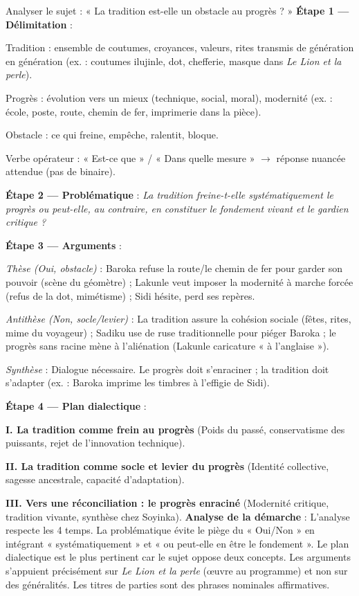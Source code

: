 \documentclass[11pt]{article}
\newcommand{\cle}[1]{{\popxbold\color{popdark}#1}}
\begin{document}
\begin{exoresolu}{Analyser le sujet : « La tradition est-elle un obstacle au progrès ? »}
\textbf{Étape 1 — Délimitation} :\par
\cle{Tradition} : ensemble de coutumes, croyances, valeurs, rites transmis de génération en génération (ex. : coutumes ilujinle, dot, chefferie, masque dans \emph{Le Lion et la perle}).\par
\cle{Progrès} : évolution vers un mieux (technique, social, moral), modernité (ex. : école, poste, route, chemin de fer, imprimerie dans la pièce).\par
\cle{Obstacle} : ce qui freine, empêche, ralentit, bloque.\par
\cle{Verbe opérateur} : « Est-ce que » / « Dans quelle mesure » $\rightarrow$ réponse nuancée attendue (pas de binaire).\par
\textbf{Étape 2 — Problématique} : \emph{La tradition freine-t-elle systématiquement le progrès ou peut-elle, au contraire, en constituer le fondement vivant et le gardien critique ?}\par
\textbf{Étape 3 — Arguments} :\par
\textit{Thèse (Oui, obstacle)} : Baroka refuse la route/le chemin de fer pour garder son pouvoir (scène du géomètre) ; Lakunle veut imposer la modernité à marche forcée (refus de la dot, mimétisme) ; Sidi hésite, perd ses repères.\par
\textit{Antithèse (Non, socle/levier)} : La tradition assure la cohésion sociale (fêtes, rites, mime du voyageur) ; Sadiku use de ruse traditionnelle pour piéger Baroka ; le progrès sans racine mène à l'aliénation (Lakunle caricature « à l'anglaise »).\par
\textit{Synthèse} : Dialogue nécessaire. Le progrès doit s'enraciner ; la tradition doit s'adapter (ex. : Baroka imprime les timbres à l'effigie de Sidi).\par
\textbf{Étape 4 — Plan dialectique} :\par
\textbf{I. La tradition comme frein au progrès} (Poids du passé, conservatisme des puissants, rejet de l'innovation technique).\par
\textbf{II. La tradition comme socle et levier du progrès} (Identité collective, sagesse ancestrale, capacité d'adaptation).\par
\textbf{III. Vers une réconciliation : le progrès enraciné} (Modernité critique, tradition vivante, synthèse chez Soyinka).
\tcblower
\textbf{Analyse de la démarche} : L'analyse respecte les 4 temps. La problématique évite le piège du « Oui/Non » en intégrant « systématiquement » et « ou peut-elle en être le fondement ». Le plan dialectique est le plus pertinent car le sujet oppose deux concepts. Les arguments s'appuient précisément sur \emph{Le Lion et la perle} (œuvre au programme) et non sur des généralités. Les titres de parties sont des phrases nominales affirmatives.
\end{exoresolu}
\end{document}
